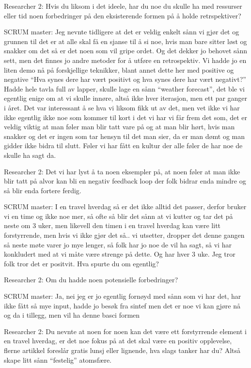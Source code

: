Researcher 2: Hvis du liksom i det ideele, har du noe du skulle ha med ressurser eller tid noen forbedringer på den eksisterende formen på å holde retrspektiver?

SCRUM master: Jeg nevnte tidligere at det er veldig enkelt sånn vi gjør det  og grunnen til det er at alle skal få en sjanse til å si noe, hvis man bare sitter løst og snakker om det så er det noen som vil gripe ordet. Og det dekker jo behovet sånn sett, men det finnes jo andre metoder for å utføre en retrospektiv. Vi hadde jo en liten demo nå på forskjellige teknikker, blant annet dette her med positive og negative ``Hva synes dere har vært positivt og hva synes dere har vært negativt?'' Hadde hele tavla full av lapper, skulle lage en sånn ``weather forecast'', det ble vi egentlig enige om at vi skulle innøre, altså ikke hver iterasjon, men ett par ganger i året. Det var interessant å se hva vi liksom fikk ut av det, men vet ikke vi har ikke egentlig ikke noe som kommer til kort i det vi har vi får frem det som, det er veldig viktig at man føler man blir tatt vare på og at man blir hørt, hvis man snakker og det er ingen som tar hensyn til det man sier, da er man dømt og man gidder ikke bidra til slutt. Føler vi har fått en kultur der alle føler de har noe de skulle ha sagt da.

Researcher 2: Det vi har lyst å ta noen eksempler på, at noen føler at man ikke blir tatt på alvor kan bli en negativ feedback loop der folk bidrar enda mindre og så blir enda fortere ferdig.

SCRUM master: I en travel hverdag så er det ikke alltid det passer, derfor bruker vi en time og ikke noe mer, så ofte så blir det sånn at vi kutter og tar det på neste om 3 uker, men likevell den timen i en travel hverdag kan være litt forstyrrende, men hvis vi ikke gjør det så.. vi utsetter, dropper det denne gangen så neste møte varer jo mye lenger, så folk har jo noe de vil ha sagt, så vi har konkludert med at vi måte være strenge på dette. Og har hver 3 uke. Jeg tror folk tror det er positvit. Hva spurte du om egentlig?

Researcher 2: Om du hadde noen potensielle forbedringer?

SCRUM master: Ja, nei jeg er jo egentlig fornøyd med sånn som vi har det, har ikke fått så mye input, hadde jo besøk fra sintef men det er noe vi kan gjøre nå og da i tillegg, men vil ha denne basci formen

Researcher 2: Du nevnte at noen for noen kan det være ett forstyrrende element i en travel hverdag, er det noe fokus på at det skal være en positiv opplevelse, flerne artikkel foreslår gratis lunsj eller lignende, hva slags tanker har du? Altså skape litt sånn ``festelig'' atomsfære.

